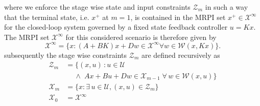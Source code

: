 \documentclass{ifacconf}
\begin{document}
%
where we enforce the stage wise state and input constraints $\mathcal Z_m$ in such a way that the terminal state,
i.e. $x^+$ at $m=1$, is contained in the MRPI set $x^+\in\mathcal X^\infty$ for the closed-loop 
system governed by a fixed state feedback controller $u=Kx$. The MRPI set $\mathcal X^\infty$ for this considered
scenario is therefore given by
%
\begin{equation}\label{eq:definition:MRPI:set}
	\mathcal X^\infty = \{x: (A+BK)x + Dw \in \mathcal X^\infty \forall w\in\mathcal W(x,Kx)\}.
\end{equation}
%
subsequently the stage wise constraints $\mathcal Z_m$ are defined recursively as
%
\begin{subequations}\label{eq:definition:stage:constraints}
\begin{align}
	\mathcal Z_m &= \{(x,u)\,: u\in\mathcal U \nonumber\\
	&\quad\ \wedge \; A x + Bu + Dw\in\mathcal X_{m-1}\; \forall\, w\in\mathcal W(x,u)\} 
	\label{eq:definition:mixed:stage:constraint}\\
	\mathcal X_m &= \{x : \exists\, u\in\mathcal U, (x,u)\in\mathcal Z_m\}
	\label{eq:definition:state:stage:constraint}\\
	\mathcal X_0 &= \mathcal X^\infty
\end{align}
\end{subequations}
\end{document}
